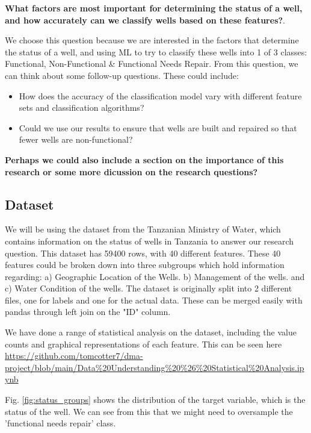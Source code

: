 \documentclass[conference]{IEEEtran}
\begin{document}
\textbf{What factors are most important for determining the status of a well, and how accurately can we classify wells based on these features?}. 

We choose this question because we are interested in the factors that determine the status of a well, and using ML to try to classify these wells into 1 of 3 classes: Functional, Non-Functional \& Functional Needs Repair. From this question, we can think about some follow-up questions. These could include:
    \begin{itemize}
        \item How does the accuracy of the classification model vary with different feature sets and classification algorithms?
        \item Could we use our results to ensure that wells are built and repaired so that fewer wells are non-functional?
    \end{itemize}

\textbf{Perhaps we could also include a section on the importance of this research or some more dicussion on the research questions?}

\subsection{Dataset}

We will be using the dataset from the Tanzanian Ministry of Water, which contains information on the status of wells in Tanzania to answer our research question. This dataset has 59400 rows, with 40 different features. These 40 features could be broken down into three subgroups which hold information regarding: a) Geographic Location of the Wells. b) Management of the wells. and c) Water Condition of the wells. The dataset is originally split into 2 different files, one for labels and one for the actual data. These can be merged easily with pandas through left join on the "ID" column. 


We have done a range of statistical analysis on the dataset, including the value counts and graphical representations of each feature. This can be seen here \url{https://github.com/tomcotter7/dma-project/blob/main/Data%20Understanding%20%26%20Statistical%20Analysis.ipynb}

Fig. \ref{fig:status_groups} shows the distribution of the target variable, which is the status of the well. We can see from this that we might need to oversample the 'functional needs repair' class.
\end{document}
